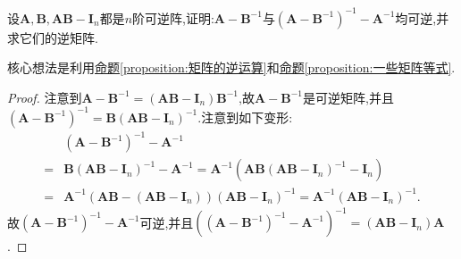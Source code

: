 \documentclass[../../main.tex]{subfiles}%
\begin{document}
\begin{example}\label{example:凑因子例1}
设\(\boldsymbol{A},\boldsymbol{B},\boldsymbol{AB}-\boldsymbol{I}_{n}\)都是\(n\)阶可逆阵,证明:\(\boldsymbol{A}-\boldsymbol{B}^{-1}\)与\((\boldsymbol{A}-\boldsymbol{B}^{-1})^{-1}-\boldsymbol{A}^{-1}\)均可逆,并求它们的逆矩阵.
\end{example}
\begin{note}
核心想法是利用\hyperref[proposition:矩阵的逆运算]{命题\ref{proposition:矩阵的逆运算}}和\hyperref[proposition:一些矩阵等式]{命题\ref{proposition:一些矩阵等式}}.
\end{note}
\begin{proof}

注意到\(\boldsymbol{A}-\boldsymbol{B}^{-1}=(\boldsymbol{AB}-\boldsymbol{I}_{n})\boldsymbol{B}^{-1}\),故\(\boldsymbol{A}-\boldsymbol{B}^{-1}\)是可逆矩阵,并且\((\boldsymbol{A}-\boldsymbol{B}^{-1})^{-1}=\boldsymbol{B}(\boldsymbol{AB}-\boldsymbol{I}_{n})^{-1}\).注意到如下变形:
\begin{align*}
&(\boldsymbol{A}-\boldsymbol{B}^{-1})^{-1}-\boldsymbol{A}^{-1}\\
=&\boldsymbol{B}(\boldsymbol{AB}-\boldsymbol{I}_{n})^{-1}-\boldsymbol{A}^{-1}=\boldsymbol{A}^{-1}(\boldsymbol{AB}(\boldsymbol{AB}-\boldsymbol{I}_{n})^{-1}-\boldsymbol{I}_{n})\\
=&\boldsymbol{A}^{-1}(\boldsymbol{AB}-(\boldsymbol{AB}-\boldsymbol{I}_{n}))(\boldsymbol{AB}-\boldsymbol{I}_{n})^{-1}=\boldsymbol{A}^{-1}(\boldsymbol{AB}-\boldsymbol{I}_{n})^{-1}.
\end{align*}
故\((\boldsymbol{A}-\boldsymbol{B}^{-1})^{-1}-\boldsymbol{A}^{-1}\)可逆,并且\((( \boldsymbol{A}-\boldsymbol{B}^{-1})^{-1}-\boldsymbol{A}^{-1})^{-1}=(\boldsymbol{AB}-\boldsymbol{I}_{n})\boldsymbol{A}\).

\end{proof}
\end{document}
